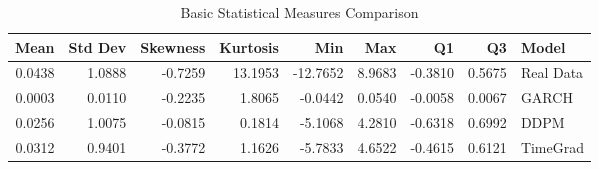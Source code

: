 \begin{table}
\caption{Basic Statistical Measures Comparison}
\label{tab:basic_stats}
\begin{tabular}{rrrrrrrrl}
\toprule
Mean & Std Dev & Skewness & Kurtosis & Min & Max & Q1 & Q3 & Model \\
\midrule
0.0438 & 1.0888 & -0.7259 & 13.1953 & -12.7652 & 8.9683 & -0.3810 & 0.5675 & Real Data \\
0.0003 & 0.0110 & -0.2235 & 1.8065 & -0.0442 & 0.0540 & -0.0058 & 0.0067 & GARCH \\
0.0256 & 1.0075 & -0.0815 & 0.1814 & -5.1068 & 4.2810 & -0.6318 & 0.6992 & DDPM \\
0.0312 & 0.9401 & -0.3772 & 1.1626 & -5.7833 & 4.6522 & -0.4615 & 0.6121 & TimeGrad \\
\bottomrule
\end{tabular}
\end{table}
